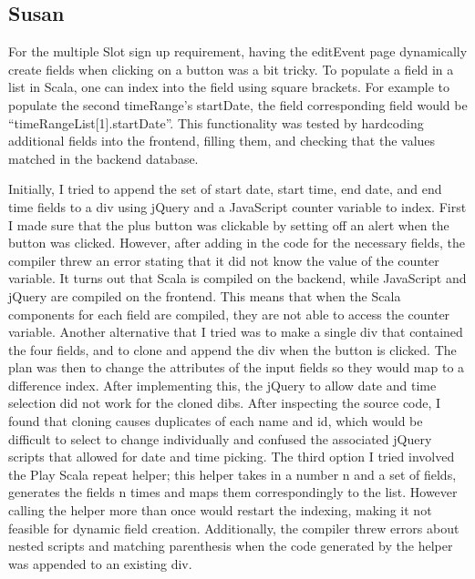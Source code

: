 \documentclass{article}
\begin{document}
\subsection{Susan}
For the multiple Slot sign up requirement, having the editEvent page dynamically create fields when clicking on a button was a bit tricky. To populate a field in a list in Scala, one can index into the field using square brackets. For example to populate the second timeRange’s startDate, the field corresponding field would be “timeRangeList[1].startDate”. This functionality was tested by hardcoding additional fields into the frontend, filling them, and checking that the values matched in the backend database.

Initially, I tried to append the set of start date, start time, end date, and end time fields to a div using jQuery and a JavaScript counter variable to index. First I made sure that the plus button was clickable by setting off an alert when the button was clicked. However, after adding in the code for the necessary fields, the compiler threw an error stating that it did not know the value of the counter variable. It turns out that Scala is compiled on the backend, while JavaScript and jQuery are compiled on the frontend. This means that when the Scala components for each field are compiled, they are not able to access the counter variable. Another alternative that I tried was to make a single div that contained the four fields, and to clone and append the div when the button is clicked. The plan was then to change the attributes of the input fields so they would map to a difference index. After implementing this, the jQuery to allow date and time selection did not work for the cloned dibs. After inspecting the source code, I found that cloning causes duplicates of each name and id, which would be difficult to select to change individually and confused the associated jQuery scripts that allowed for date and time picking. The third option I tried involved the Play Scala repeat helper; this helper takes in a number n and a set of fields, generates the fields n times and maps them correspondingly to the list. However calling the helper more than once would restart the indexing, making it not feasible for dynamic field creation. Additionally, the compiler threw errors about nested scripts and matching parenthesis when the code generated by the helper was appended to an existing div.
\end{document}
